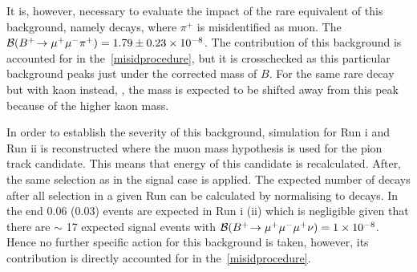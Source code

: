 It is, however, necessary to evaluate the impact of the rare equivalent of this background, namely \bmumupi decays, where $\pi^{+}$ is misidentified as muon. The $\mathcal{B}({{{B}^+}}\!\rightarrow {\ensuremath{\mu^+\mu^-}}{\ensuremath{{\pi}^+}})=1.79\pm0.23\times 10^{-8}$\cite{Patrignani:2016xqp}. The contribution of this background is accounted for in the~\autoref{misidprocedure}, but it is crosschecked as this particular background peaks just under the corrected mass of $B$. For the same rare decay but with kaon instead, \bmumuk, the mass is expected to be shifted away from this peak because of the higher kaon mass.

In order to establish the severity of this background, \bmumupi simulation for Run \Rn{1} and Run \Rn{2} is reconstructed where the muon mass hypothesis is used for the pion track candidate. This means that energy of this candidate is recalculated. After, the same selection as in the signal case is applied. The expected number of \bmumupi decays after all selection in a given Run can be calculated by normalising to \bjpsimumuk decays. In the end 0.06 (0.03) \bmumupi events are expected in Run \Rn{1} (\Rn{2}) which is negligible given that there are $\sim$ 17 expected signal events with $\mathcal{B}({{{B}^+}}\!\rightarrow {\ensuremath{\mu^+\mu^-\mu^+}}\nu)=1\times 10^{-8}$. Hence no further specific action for this background is taken, however, its contribution is directly accounted for in the~\autoref{misidprocedure}.





